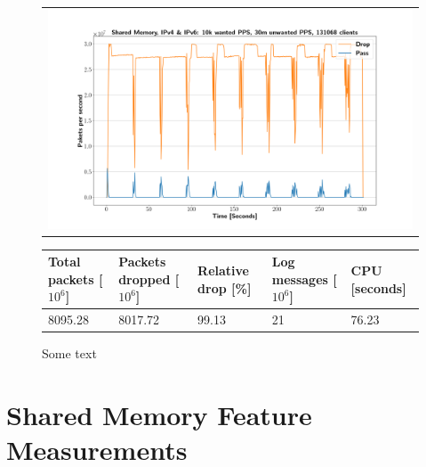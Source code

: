 \begin{figure}[p]
	\label{fig:simplefail2ban:shm:ip46:30m}
	\centering
	\scriptsize
	\begin{tabular}{c}
    	\centerline{\includegraphics[width=1.2\textwidth]{images/simplefail2ban_shm_ipv46_v10k_iv30m_c131068.png}}
	\end{tabular}
	\begin{tabular}{lllll}
		\toprule
		\textbf{Total packets [$10^6$]} & \textbf{Packets dropped [$10^6$]} & \textbf{Relative drop [\%]} & \textbf{Log messages [$10^6$]} & \textbf{CPU [seconds]} \\ \midrule 
		8095.28 & 8017.72 & 99.13 & 21 & 76.23 \\
		\bottomrule
	\end{tabular}
	\caption[Simplefail2ban, Shared Memory, IPv4 \& IPv6, 30m \ac{PPS}]{Some text}
\end{figure}

\section{Shared Memory Feature Measurements}

